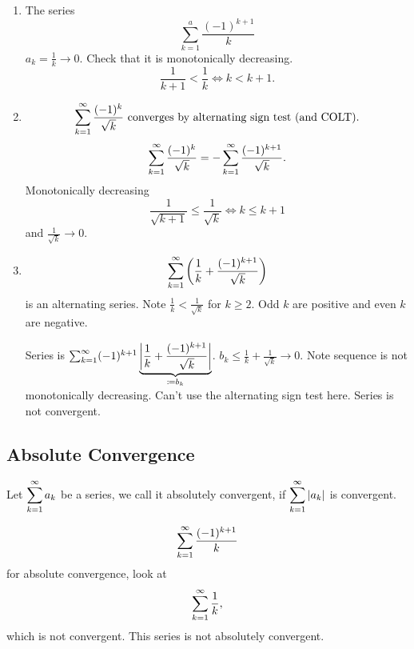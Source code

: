 \documentclass[10pt, a4paper]{article}
\begin{document}
\begin{example}
    \begin{enumerate}[label = (\alph*)]
        \item The series
        \[
        \sum_{k = 1}^{a}\frac{(-1) ^ {k + 1}}{k}
        \]
        $a_k = \frac{1}{k} \rightarrow 0$.
        Check that it is monotonically decreasing.
        \[
        \frac{1}{k + 1} < \frac{1}{k} \iff k < k + 1.
        \]
        \item
        \[
        \infsum[k = 1]\frac{(-1) ^ k}{\sqrt{k}}\text{ converges by alternating sign test (and COLT)}.
        \]
        \[
        \infsum[k = 1]\frac{(-1) ^ k}{\sqrt{k}} = -\infsum[k = 1]\frac{(-1) ^ {k + 1}}{\sqrt{k}}.
        \]
        Monotonically decreasing
        \[
        \frac{1}{\sqrt{k + 1}} \leq \frac{1}{\sqrt{k}} \iff k \leq k + 1
        \]
        and $\frac{1}{\sqrt{k}} \rightarrow 0$.
        \item
        \[
        \infsum[k = 1]\left(\frac{1}{k} + \frac{(-1) ^ {k + 1}}{\sqrt{k}}\right)
        \]
        is an alternating series.
        Note $\frac{1}{k} < \frac{1}{\sqrt{k}}$ for $k \geq 2$.
        Odd $k$ are positive and even $k$ are negative.
        
        Series is $\infsum[k = 1](-1) ^ {k + 1}\underbrace{\left|\frac{1}{k} + \frac{(-1) ^ {k + 1}}{\sqrt{k}}\right|}_{\coloneqq b_k}$.
        $b_k \leq \frac{1}{k} + \frac{1}{\sqrt{k}} \rightarrow 0$.
        Note sequence is not monotonically decreasing.
        Can't use the alternating sign test here.
        Series is not convergent.
    \end{enumerate}
\end{example}

\subsection{Absolute Convergence}
\begin{definition}
    Let $\displaystyle\infsum[k = 1]a_k$ be a series,
    we call it absolutely convergent,
    if $\displaystyle\infsum[k = 1]|a_k|$ is convergent.
\end{definition}

\begin{example}
    \[
    \infsum[k = 1]\frac{(-1) ^ {k + 1}}{k}
    \]
    for absolute convergence,
    look at
    \[
    \infsum[k = 1]\frac{1}{k},
    \]
    which is not convergent.
    This series is not absolutely convergent.
\end{example}
\end{document}
